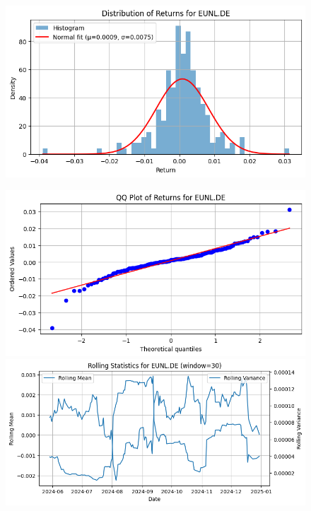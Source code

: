 \documentclass{article}%
\begin{document}
\begin{figure}[htbp]
\begin{minipage}{0.31\textwidth}
\includegraphics[width=\linewidth]{ticker_images/EUNL.DE_return_distribution.png}%
\end{minipage}%
\end{figure}

%


\begin{figure}[htbp]%
\begin{minipage}{0.48\textwidth}%
\includegraphics[width=\linewidth]{ticker_images/EUNL.DE_qq_plot.png}%
\end{minipage}%
\begin{minipage}{0.48\textwidth}%
\includegraphics[width=\linewidth]{ticker_images/EUNL.DE_rolling_stats.png}%
\end{minipage}%
\end{figure}
\end{document}
